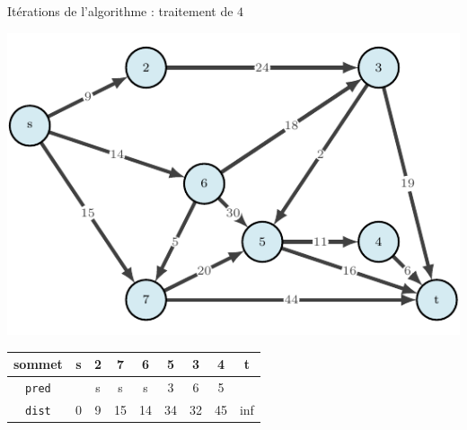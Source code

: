 \begin{frame}{Itérations de l'algorithme : traitement de $4$}
    \begin{center}
        \includegraphics[height=.6\textheight]{fig/ordinal-0.pdf}      
    \begin{tabular}{c|cccccccc}
        
        sommet & s       &2      &7      &6      &5      &3      &4      &t      \\
        \hline
        \texttt{pred} & &s      &s      &s      &3      &6      &5      &       \\
        \texttt{dist} & 0       &9      &15     &14     &34     &32     &45     &inf    \\
    \end{tabular}
\end{center}
\end{frame}

